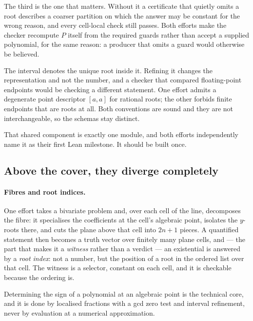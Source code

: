 The third is the one that matters. Without it a certificate that quietly omits
a root describes a coarser partition on which the answer may be constant for
the wrong reason, and every cell-local check still passes. Both efforts make
the checker recompute $P$ itself from the required guards rather than accept a
supplied polynomial, for the same reason: a producer that omits a guard would
otherwise be believed.

\begin{remark}
The interval denotes the unique root inside it. Refining it changes the
representation and not the number, and a checker that compared floating-point
endpoints would be checking a different statement. One effort admits a
degenerate point descriptor $[a,a]$ for rational roots; the other forbids
finite endpoints that are roots at all. Both conventions are sound and they are
not interchangeable, so the schemas stay distinct.
\end{remark}

That shared component is exactly one module, and both efforts independently
name it as their first Lean milestone. It should be built once.

\subsection{Above the cover, they diverge completely}

\paragraph{Fibres and root indices.} One effort takes a bivariate problem and,
over each cell of the line, decomposes the fibre: it specialises the
coefficients at the cell's algebraic point, isolates the $y$-roots there, and
cuts the plane above that cell into $2n+1$ pieces. A quantified statement then
becomes a truth vector over finitely many plane cells, and --- the part that
makes it a \emph{witness} rather than a verdict --- an existential is answered
by a \emph{root index}: not a number, but the position of a root in the ordered
list over that cell. The witness is a selector, constant on each cell, and it
is checkable because the ordering is.

Determining the sign of a polynomial at an algebraic point is the technical
core, and it is done by localised fractions with a gcd zero test and interval
refinement, never by evaluation at a numerical approximation.

